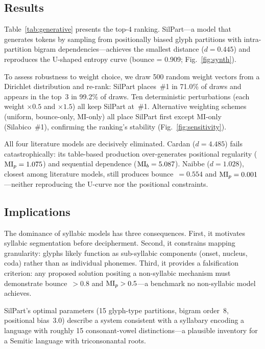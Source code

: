 \subsection{Results}

Table~\ref{tab:generative} presents the top-4 ranking.  SilPart---a model that generates tokens by sampling from positionally biased glyph partitions with intra-partition bigram dependencies---achieves the smallest distance ($d = 0.445$) and reproduces the U-shaped entropy curve (bounce = 0.909; Fig.~\ref{fig:synth}).

To assess robustness to weight choice, we draw 500 random weight vectors from a Dirichlet distribution and re-rank: SilPart places~\#1 in 71.0\% of draws and appears in the top~3 in 99.2\% of draws.  Ten deterministic perturbations (each weight $\times 0.5$ and $\times 1.5$) all keep SilPart at~\#1.  Alternative weighting schemes (uniform, bounce-only, MI-only) all place SilPart first except MI-only (Silabico~\#1), confirming the ranking's stability (Fig.~\ref{fig:sensitivity}).

All four literature models are decisively eliminated.  Cardan ($d = 4.485$) fails catastrophically: its table-based production over-generates positional regularity ($\mathrm{MI}_p = 1.075$) and sequential dependence ($\mathrm{MI}_b = 5.087$).  Naibbe ($d = 1.028$), closest among literature models, still produces bounce~$= 0.554$ and $\mathrm{MI}_p = 0.001$---neither reproducing the U-curve nor the positional constraints.

\subsection{Implications}

The dominance of syllabic models has three consequences.  First, it motivates syllabic segmentation before decipherment.  Second, it constrains mapping granularity: glyphs likely function as sub-syllabic components (onset, nucleus, coda) rather than as individual phonemes.  Third, it provides a falsification criterion: any proposed solution positing a non-syllabic mechanism must demonstrate bounce~$> 0.8$ and $\mathrm{MI}_p > 0.5$---a benchmark no non-syllabic model achieves.

SilPart's optimal parameters (15 glyph-type partitions, bigram order~8, positional bias~3.0) describe a system consistent with a syllabary encoding a language with roughly 15 consonant-vowel distinctions---a plausible inventory for a Semitic language with triconsonantal roots.

